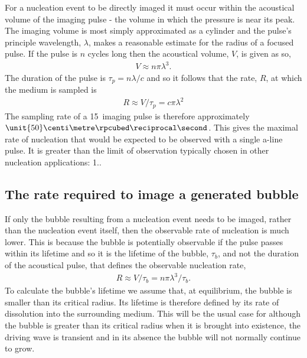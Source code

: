 For a nucleation event to be directly imaged
it must occur within the acoustical volume of the imaging pulse -
the volume in which the pressure is near its peak.
%
The imaging volume is most simply approximated as a cylinder
and the pulse's principle wavelength, $\lambda$, makes a reasonable estimate for the radius of a focused pulse.
If the pulse is $n$ cycles long then the acoustical volume, $V$, is given as so,
\begin{align}
  V \approx n  \pi \lambda^3.
\end{align}
The duration of the pulse is $\tau_p=n\lambda/c$ and so it follows that the rate, $R$, at which the medium is sampled is 
\begin{align}
R \approx V/\tau_p = c\pi\lambda^2 
\end{align}
The sampling rate of a \unit{15}\mega\hertz\ imaging pulse is therefore approximately
$\unit{50}\centi\metre\rpcubed\reciprocal\second$.
This gives the maximal rate of nucleation that would  be expected to be observed with a single a-line pulse.
It is greater than the limit of observation typically chosen in other nucleation applications: \unit{1}\centi\metre\rpcubed\reciprocal\second..

\subsection{The rate required to image a generated bubble}

If only the bubble resulting from a nucleation event needs to be imaged, rather than the nucleation event itself, 
then the observable rate of nucleation is much lower.
This is because the bubble is potentially observable if the pulse passes within its lifetime 
and so it is the lifetime of the bubble, $\tau_b$, and not the duration of the acoustical pulse,
that defines the observable nucleation rate,
\begin{align}
R\approx V/\tau_b = n\pi\lambda^3/\tau_b.
\label{eqn:observable_rate_lifetime}
\end{align}
To calculate the bubble's lifetime we assume that, at equilibrium, the bubble is smaller than its critical radius.
Its lifetime is therefore defined by its rate of dissolution into the surrounding medium.
This will be the usual case
for although the bubble is greater than its critical radius when it is brought into existence,
the driving wave is transient and in its absence the bubble will not normally continue to grow.


